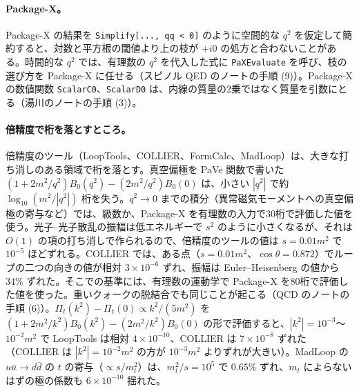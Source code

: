 \documentclass[a4paper,10pt]{ltjsarticle}
\begin{document}
\paragraph{Package-X。}Package-X の結果を \texttt{Simplify[..., qq < 0]} のように空間的な $q^2$ を仮定して簡約すると、対数と平方根の閾値より上の枝が $+i0$ の処方と合わないことがある。時間的な $q^2$ では、有理数の $q^2$ を代入した式に \texttt{PaXEvaluate} を呼び、枝の選び方を Package-X に任せる（スピノル QED のノートの手順 (9)）。Package-X の数値関数 \texttt{ScalarC0}、\texttt{ScalarD0} は、内線の質量の2乗ではなく質量を引数にとる（湯川のノートの手順 (3)）。

\paragraph{倍精度で桁を落とすところ。}倍精度のツール（LoopTools、COLLIER、FormCalc、MadLoop）は、大きな打ち消しのある領域で桁を落とす。真空偏極を PaVe 関数で書いた $(1+2m^2/q^2)B_0(q^2)-(2m^2/q^2)B_0(0)$ は、小さい $|q^2|$ で約 $\log_{10}(m^2/|q^2|)$ 桁を失う。$q^2\to0$ までの積分（異常磁気モーメントへの真空偏極の寄与など）では、級数か、Package-X を有理数の入力で30桁で評価した値を使う。光子--光子散乱の振幅は低エネルギーで $s^2$ のように小さくなるが、それは $O(1)$ の項の打ち消しで作られるので、倍精度のツールの値は $s=0.01m^2$ で $10^{-5}$ ほどずれる。COLLIER では、ある点（$s=0.01m^2$、$\cos\theta=0.872$）でループの二つの向きの値が相対 $3\times10^{-6}$ ずれ、振幅は Euler--Heisenberg の値から $34\%$ ずれた。そこでの基準には、有理数の運動学で Package-X を80桁で評価した値を使った。重いクォークの脱結合でも同じことが起こる（QCD のノートの手順 (6)）。$\Pi_t(k^2)-\Pi_t(0)\propto k^2/(5m^2)$ を $(1+2m^2/k^2)B_0(k^2)-(2m^2/k^2)B_0(0)$ の形で評価すると、$|k^2|=10^{-3}$〜$10^{-2}m^2$ で LoopTools は相対 $4\times10^{-10}$、COLLIER は $7\times10^{-8}$ ずれた（COLLIER は $|k^2|=10^{-2}m^2$ の方が $10^{-3}m^2$ よりずれが大きい）。MadLoop の $u\bar u\to d\bar d$ の $t$ の寄与（$\propto s/m_t^2$）は、$m_t^2/s=10^5$ で $0.65\%$ ずれ、$m_t$ によらないはずの極の係数も $6\times10^{-10}$ 揺れた。
\end{document}
